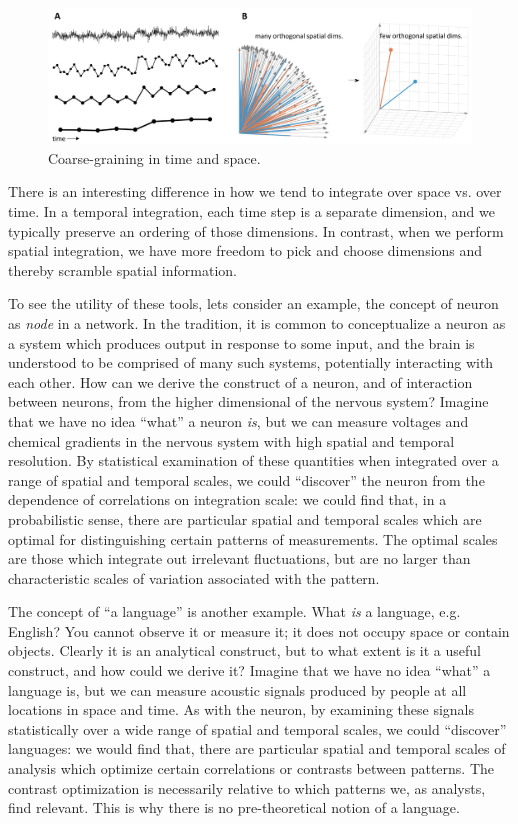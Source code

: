   
\begin{figure}
\includegraphics[width=\textwidth]{figures/Tilsen-img171.png}
\caption{Coarse-graining in time and space.}
\label{fig:8:5}
\end{figure}
 

  There is an interesting difference in how we tend to integrate over space vs. over time. In a temporal integration, each time step is a separate dimension, and we typically preserve an ordering of those dimensions. In contrast, when we perform spatial integration, we have more freedom to pick and choose dimensions and thereby scramble spatial information.

To see the utility of these tools, lets consider an example, the concept of neuron as \textit{node} in a network. In the  tradition, it is common to conceptualize a neuron as a system which produces output in response to some input, and the brain is understood to be comprised of many such systems, potentially interacting with each other. How can we derive the construct of a neuron, and of interaction between neurons, from the higher dimensional  of the nervous system? Imagine that we have no idea “what” a neuron \textit{is}, but we can measure voltages and chemical gradients in the nervous system with high spatial and temporal resolution. By statistical examination of these quantities when integrated over a range of spatial and temporal scales, we could “discover” the neuron from the dependence of correlations on integration scale: we could find that, in a probabilistic sense, there are particular spatial and temporal scales which are optimal for distinguishing certain patterns of measurements. The optimal scales are those which integrate out irrelevant fluctuations, but are no larger than characteristic scales of variation associated with the pattern.

  The concept of “a language” is another example. What \textit{is} a language, e.g. English? You cannot observe it or measure it; it does not occupy space or contain objects. Clearly it is an analytical construct, but to what extent is it a useful construct, and how could we derive it? Imagine that we have no idea “what” a language is, but we can measure acoustic signals produced by people at all locations in space and time. As with the neuron, by examining these signals statistically over a wide range of spatial and temporal scales, we could “discover” languages: we would find that, there are particular spatial and temporal scales of analysis which optimize certain correlations or contrasts between patterns. The contrast optimization is necessarily relative to which patterns we, as analysts, find relevant. This is why there is no pre-theoretical notion of a language.

